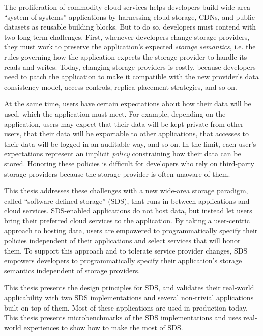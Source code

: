 The proliferation of commodity cloud services helps developers build
wide-area ``system-of-systems'' applications by harnessing
cloud storage, CDNs, and public datasets as reusable building blocks.
But to do so, developers must contend with two
long-term challenges.  First, whenever developers change storage providers, 
they must work to preserve the application's expected \emph{storage
semantics}, i.e. the rules governing how the application expects the
storage provider to handle its reads and writes.  Today, changing
storage providers is costly, because developers need to patch
the application to make it compatible with the new provider's
data consistency model, access controls, replica placement
strategies, and so on.

At the same time, users have certain expectations about how their
data will be used, which the application must meet.
For example, depending on the application, users
may expect that their data will be kept private from other users, that their data will be exportable
to other applications, that accesses to their data will be logged in an auditable way,
and so on.  In the limit, each user's expectations represent an implicit
\emph{policy} constraining how their data can be stored.  Honoring
these policies is difficult for developers who rely on third-party storage
providers because the storage provider is often unaware of them.

This thesis addresses these challenges with a new wide-area storage paradigm, called ``software-defined
storage'' (SDS), that runs in-between applications and cloud services.
SDS-enabled applications do not host data, but instead let users
bring their preferred cloud services to the application.  By taking a
user-centric approach to hosting data, users are empowered to programmatically
specify their policies independent of their applications and select
services that will honor them.  To support this approach and to
tolerate service provider changes, SDS empowers developers to programmatically
specify their application's storage semantics independent of storage providers.

This thesis presents the design principles for SDS, and validates their
real-world applicability with two SDS implementations and several non-trivial
applications built on top of them.  Most of these applications are used in
production today.  This thesis
presents microbenchmarks of the SDS implementations and uses
real-world experiences to show how to make the most of SDS.
